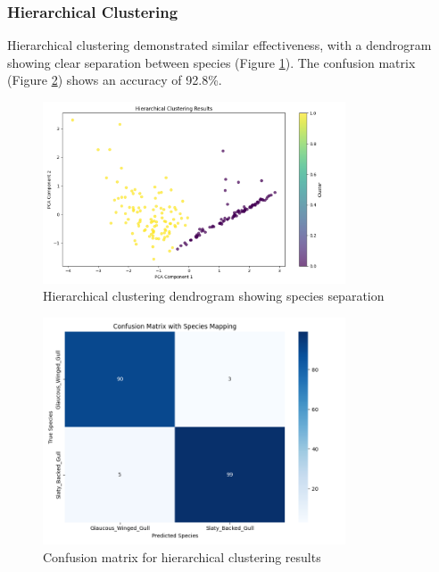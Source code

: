 \documentclass[a4paper,12pt]{report}
\begin{document}
\subsubsection{Hierarchical Clustering}
Hierarchical clustering demonstrated similar effectiveness, with a dendrogram showing clear separation between species (Figure \ref{fig:hierarchical_clustering}). The confusion matrix (Figure \ref{fig:hierarchical_confusion_matrix}) shows an accuracy of 92.8\%.

\begin{figure}[H]
    \centering
    \includegraphics[width=0.8\textwidth]{images/clustering/hierarchical_clustering.png}
    \caption{Hierarchical clustering dendrogram showing species separation}
    \label{fig:hierarchical_clustering}
\end{figure}

\begin{figure}[H]
    \centering
    \includegraphics[width=0.8\textwidth]{images/clustering/hierarchical_confusion_matrix.png}
    \caption{Confusion matrix for hierarchical clustering results}
    \label{fig:hierarchical_confusion_matrix}
\end{figure}
\end{document}
